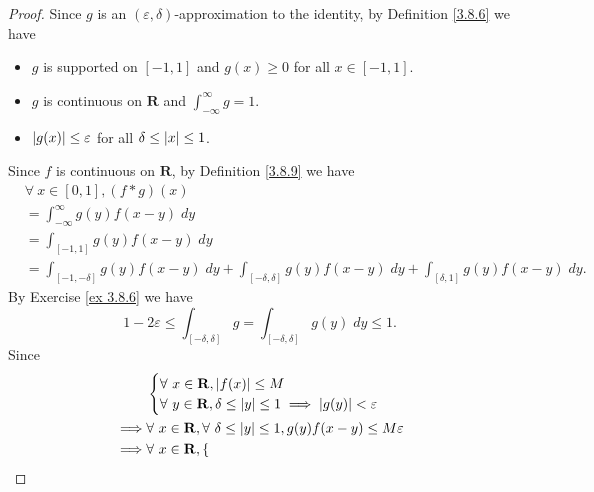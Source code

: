 \begin{proof}
    Since \(g\) is an \((\varepsilon, \delta)\)-approximation to the identity, by Definition \ref{3.8.6} we have
    \begin{itemize}
        \item \(g\) is supported on \([-1, 1]\) and \(g(x) \geq 0\) for all \(x \in [-1, 1]\).
        \item \(g\) is continuous on \(\mathbf{R}\) and \(\int_{-\infty}^\infty g = 1\).
        \item \(\abs*{g(x)} \leq \varepsilon\) for all \(\delta \leq \abs*{x} \leq 1\).
    \end{itemize}
    Since \(f\) is continuous on \(\mathbf{R}\), by Definition \ref{3.8.9} we have
    \begin{align*}
         & \forall\ x \in [0, 1], (f * g)(x)                                                                                                   \\
         & = \int_{-\infty}^\infty g(y) f(x - y) \; dy                                                                                         \\
         & = \int_{[-1, 1]} g(y) f(x - y) \; dy                                                                                                \\
         & = \int_{[-1, -\delta]} g(y) f(x - y) \; dy + \int_{[-\delta, \delta]} g(y) f(x - y) \; dy + \int_{[\delta, 1]} g(y) f(x - y) \; dy.
    \end{align*}
    By Exercise \ref{ex 3.8.6} we have
    \[
        1 - 2 \varepsilon \leq \int_{[-\delta, \delta]} g = \int_{[-\delta, \delta]} g(y) \; dy \leq 1.
    \]
    Since
    \begin{align*}
                 & \begin{cases}
            \forall\ x \in \mathbf{R}, \abs*{f(x)} \leq M \\
            \forall\ y \in \mathbf{R}, \delta \leq \abs*{y} \leq 1 \implies \abs*{g(y)} < \varepsilon
        \end{cases}                                                                                                                              \\
        \implies & \forall\ x \in \mathbf{R}, \forall\ \delta \leq \abs*{y} \leq 1, g(y) f(x - y) \leq M \varepsilon                                                       \\
        \implies & \forall\ x \in \mathbf{R}, \begin{cases}

\end{cases}
\end{align*}
\end{proof}
